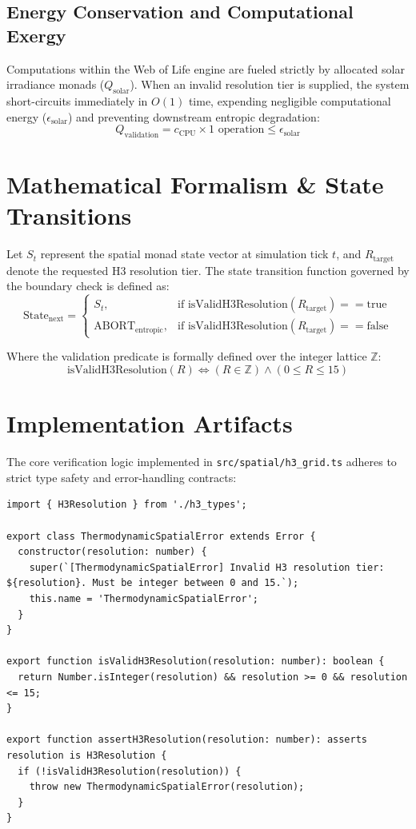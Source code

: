 \documentclass[11pt, a4paper]{article}
\begin{document}
\subsection{Energy Conservation and Computational Exergy}
Computations within the Web of Life engine are fueled strictly by allocated solar irradiance monads ($Q_{\text{solar}}$). When an invalid resolution tier is supplied, the system short-circuits immediately in $O(1)$ time, expending negligible computational energy ($\epsilon_{\text{solar}}$) and preventing downstream entropic degradation:
\begin{equation}
Q_{\text{validation}} = c_{\text{CPU}} \times 1 \text{ operation} \le \epsilon_{\text{solar}}
\end{equation}

\section{Mathematical Formalism \& State Transitions}
Let $S_t$ represent the spatial monad state vector at simulation tick $t$, and $R_{\text{target}}$ denote the requested H3 resolution tier. The state transition function governed by the boundary check is defined as:
\begin{equation}
\text{State}_{\text{next}} = \begin{cases} 
S_t, & \text{if } \text{isValidH3Resolution}(R_{\text{target}}) == \text{true} \\ 
\text{ABORT}_{\text{entropic}}, & \text{if } \text{isValidH3Resolution}(R_{\text{target}}) == \text{false} 
\end{cases}
\end{equation}

Where the validation predicate is formally defined over the integer lattice $\mathbb{Z}$:
\begin{equation}
\text{isValidH3Resolution}(R) \iff (R \in \mathbb{Z}) \land (0 \le R \le 15)
\end{equation}

\section{Implementation Artifacts}
The core verification logic implemented in \texttt{src/spatial/h3\_grid.ts} adheres to strict type safety and error-handling contracts:

\begin{lstlisting}
import { H3Resolution } from './h3_types';

export class ThermodynamicSpatialError extends Error {
  constructor(resolution: number) {
    super(`[ThermodynamicSpatialError] Invalid H3 resolution tier: ${resolution}. Must be integer between 0 and 15.`);
    this.name = 'ThermodynamicSpatialError';
  }
}

export function isValidH3Resolution(resolution: number): boolean {
  return Number.isInteger(resolution) && resolution >= 0 && resolution <= 15;
}

export function assertH3Resolution(resolution: number): asserts resolution is H3Resolution {
  if (!isValidH3Resolution(resolution)) {
    throw new ThermodynamicSpatialError(resolution);
  }
}
\end{lstlisting}
\end{document}
